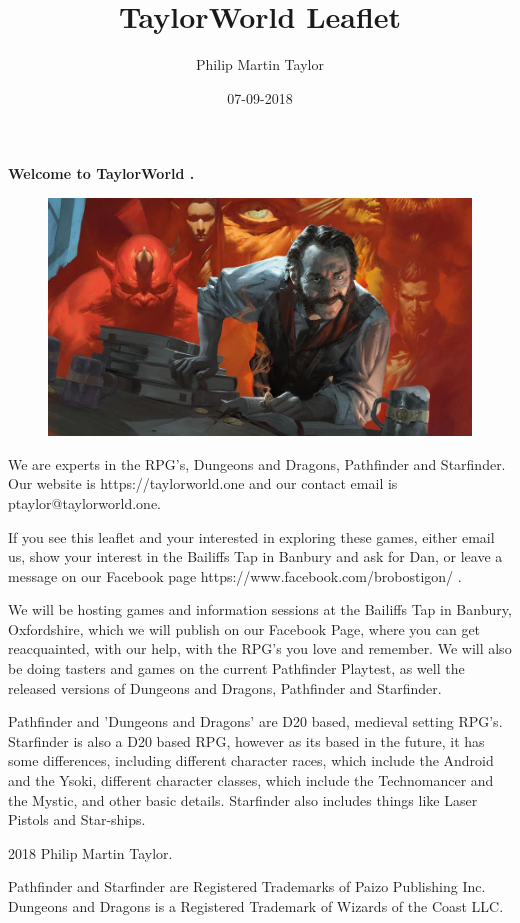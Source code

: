 \documentclass[12pt,a4paper]{book}
\date{07-09-2018}
\author{Philip Martin Taylor}
\title{TaylorWorld Leaflet}
\begin{document}
 
\begin{center} 
\textbf{Welcome to TaylorWorld \texttrademark.} 
\end{center} 
\begin{figure}[h]
  \centering
  \includegraphics[scale=0.15]{alchemist.jpg}
\end{figure}
\begin{flushleft} We are experts in the RPG's, Dungeons and Dragons, Pathfinder and Starfinder. Our website is https://taylorworld.one and our contact email is ptaylor@taylorworld.one. 
\end{flushleft} 
\begin{flushleft}
  If you see this leaflet and your interested in exploring these games, either email us, show your interest in the Bailiffs Tap in Banbury 
and ask for Dan, or leave a message on our Facebook page https://www.facebook.com/brobostigon/ . 
\end{flushleft} 
\begin{flushleft}
 We will be hosting games and information sessions at the Bailiffs Tap in Banbury, Oxfordshire, which we will publish on our Facebook Page, 
where you can get reacquainted, with our help, with the RPG's you love and remember. We will also be doing tasters and games on the current 
Pathfinder Playtest, as well the released versions of Dungeons and Dragons, Pathfinder and Starfinder. 
\end{flushleft} 
\begin{flushleft}
  Pathfinder and 'Dungeons and Dragons' are D20 based, medieval setting RPG's. Starfinder is also a D20 based RPG, however as its based in 
the future, it has some differences, including different character races, which include the Android and the Ysoki, different character 
classes, which include the Technomancer and the Mystic, and other basic details. Starfinder also includes things like Laser Pistols and 
Star-ships. 
\end{flushleft} 
\begin{center}
  \textcopyright{} 2018 Philip Martin Taylor. 
\end{center} 
\begin{center}
  Pathfinder and Starfinder are Registered Trademarks of Paizo Publishing Inc. Dungeons and Dragons is a Registered Trademark of Wizards of 
the Coast LLC. 
\end{center}
\end{document}
